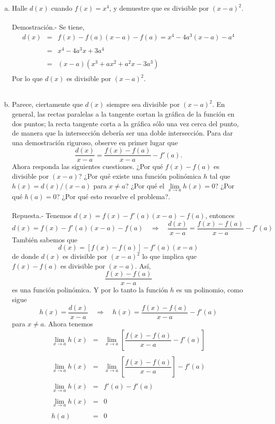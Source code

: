 \begin{enumerate}[\bfseries 1]
\begin{enumerate}[(a)]
	    \item Halle $d(x)$ cuando $f(x)=x^4$, y demuestre que es divisible por $(x-a)^2$.\\\\
		Demostración.-\; Se tiene,
		$$\begin{array}{rcl}
		    d(x)&=&f(x)-f(a)(x-a)-f(a)=x^4-4a^3(x-a)-a^4\\\\
			&=&x^4-4a^3x+3a^4\\\\
			&=&(x-a)(x^3+ax^2+a^2x-3a^3)\\
		\end{array}$$
		Por lo que $d(x)$ es divisible por $(x-a)^2$.\\\\

	    \item Parece, ciertamente que $d(x)$ siempre sea divisible por $(x-a)^2$. En general, las rectas paralelas a la tangente cortan la gráfica de la función en dos puntos; la recta tangente corta a la gráfica sólo una vez cerca del punto, de manera que la intersección debería ser una doble intersección. Para dar una demostración riguroso, observe en primer lugar que 
	    $$\dfrac{d(x)}{x-a}=\dfrac{f(x)-f(a)}{x-a}-f'(a).$$
	    Ahora responda las siguientes cuestiones. ¿Por qué $f(x)-f(a)$ es divisible por $(x-a)$? ¿Por qué existe una función polinómica $h$ tal que $h(x)=d(x)/(x-a)$ para $x\neq a$? ¿Por qué el $\lim\limits_{x\to a} h(x) = 0$? ¿Por qué $h(a)=0$? ¿Por qué esto resuelve el problema?.\\\\
		Repuesta.-\; Tenemos $d(x)=f(x)-f'(a)(x-a)-f(a)$, entonces
		$$d(x)=f(x)-f'(a)(x-a)-f(a) \quad \Rightarrow \quad \dfrac{d(x)}{x-a}=\dfrac{f(x)-f(a)}{x-a}-f'(a)$$
		También sabemos que
		$$d(x)=[f(x)-f(a)]-f'(a)(x-a)$$
		de donde $d(x)$ es divisible por $(x-a)^2$ lo que implica que $f(x)-f(a)$ es divisible por $(x-a)$. Así,
		$$\dfrac{f(x)-f(a)}{x-a}$$
		es una función polinómica. Y por lo tanto la función $h$ es un polinomio, como sigue
		$$h(x)=\dfrac{d(x)}{x-a}\quad \Rightarrow \quad h(x)=\dfrac{f(x)-f(a)}{x-a}-f'(a)$$
		para $x\neq a$. Ahora tenemos 
		$$\begin{array}{rcl}
		    \lim\limits_{x\to a} h(x) &=&\lim\limits_{x\to a} \left[\dfrac{f(x)-f(a)}{x-a}-f'(a)\right]\\\\
		    \lim\limits_{x\to a} h(x) &=&\lim\limits_{x\to a} \left[\dfrac{f(x)-f(a)}{x-a}\right]-f'(a)\\\\
		    \lim\limits_{x\to a} h(x) &=&f'(a)-f'(a)\\\\
		    \lim\limits_{x\to a} h(x) &=&0\\\\
					      h(a)&=&0\\\\
		\end{array}$$


\end{enumerate}
\end{enumerate}
